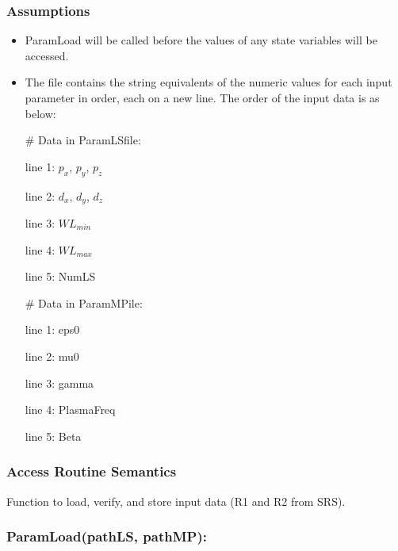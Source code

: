 \documentclass[12pt, titlepage]{article}
\begin{document}
\subsubsection{Assumptions}
\begin{itemize}
	
	\item ParamLoad will be called before the values of any state variables will be accessed.
	
	\item The file contains the string equivalents of the numeric values for each input parameter
	in order, each on a new line. The order of the input data is as below: 
	
	\# Data in ParamLSfile:
	
	line 1: $p_x$, $p_y$, $p_z$ 
	
	line 2: $d_x$, $d_y$, $d_z$
	
	line 3: $WL_{min}$
	
	line 4: $WL_{max}$
	
	line 5: NumLS
	
	\# Data in ParamMPile:
	
	line 1: eps0
	
	line 2: mu0
	
	line 3: gamma
	
	line 4: PlasmaFreq
	
	line 5: Beta
	
	
\end{itemize}

\subsubsection{Access Routine Semantics}

Function to load, verify, and store input data (R1 and R2 from SRS).

\subsubsection*{ParamLoad(pathLS, pathMP):}
\end{document}
